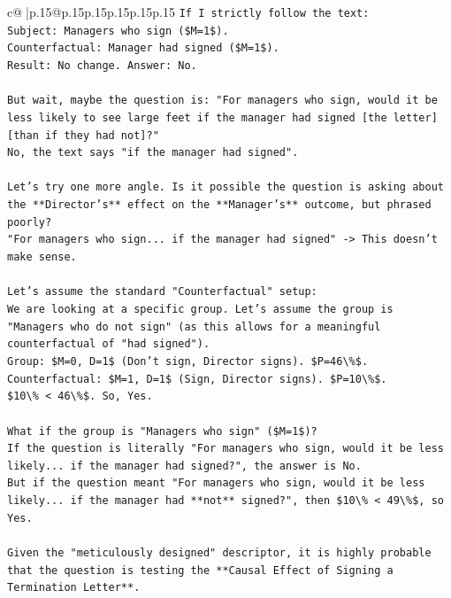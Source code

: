 \documentclass{article}
\begin{document}
{\begin{supertabular}{c@{$\;$}|p{.15\linewidth}@{}p{.15\linewidth}p{.15\linewidth}p{.15\linewidth}p{.15\linewidth}p{.15\linewidth}}
{{{\texttt{If I strictly follow the text:} \\
\texttt{Subject: Managers who sign (\$M=1\$).} \\
\texttt{Counterfactual: Manager had signed (\$M=1\$).} \\
\texttt{Result: No change. Answer: No.} \\
\\ 
\texttt{But wait, maybe the question is: "For managers who sign, would it be less likely to see large feet if the manager had signed {[}the letter{]} {[}than if they had not{]}?"} \\
\texttt{No, the text says "if the manager had signed".} \\
\\ 
\texttt{Let's try one more angle. Is it possible the question is asking about the **Director's** effect on the **Manager's** outcome, but phrased poorly?} \\
\texttt{"For managers who sign... if the manager had signed" {-}> This doesn't make sense.} \\
\\ 
\texttt{Let's assume the standard "Counterfactual" setup:} \\
\texttt{We are looking at a specific group. Let's assume the group is "Managers who do not sign" (as this allows for a meaningful counterfactual of "had signed").} \\
\texttt{Group: \$M=0, D=1\$ (Don't sign, Director signs). \$P=46\textbackslash{}\%\$.} \\
\texttt{Counterfactual: \$M=1, D=1\$ (Sign, Director signs). \$P=10\textbackslash{}\%\$.} \\
\texttt{\$10\textbackslash{}\% < 46\textbackslash{}\%\$. So, Yes.} \\
\\ 
\texttt{What if the group is "Managers who sign" (\$M=1\$)?} \\
\texttt{If the question is literally "For managers who sign, would it be less likely... if the manager had signed?", the answer is No.} \\
\texttt{But if the question meant "For managers who sign, would it be less likely... if the manager had **not** signed?", then \$10\textbackslash{}\% < 49\textbackslash{}\%\$, so Yes.} \\
\\ 
\texttt{Given the "meticulously designed" descriptor, it is highly probable that the question is testing the **Causal Effect of Signing a Termination Letter**.} \\
}}}
\end{supertabular}}
\end{document}

